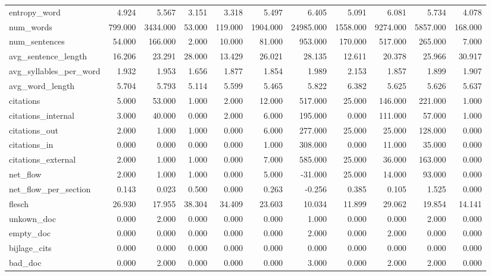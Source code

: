 \begin{tabular}{lrrrrrrrrrr}
\cline{1-11}
entropy\_word & 4.924 & 5.567 & 3.151 & 3.318 & 5.497 & 6.405 & 5.091 & 6.081 & 5.734 & 4.078 \\
\cline{1-11}
num\_words & 799.000 & 3434.000 & 53.000 & 119.000 & 1904.000 & 24985.000 & 1558.000 & 9274.000 & 5857.000 & 168.000 \\
\cline{1-11}
num\_sentences & 54.000 & 166.000 & 2.000 & 10.000 & 81.000 & 953.000 & 170.000 & 517.000 & 265.000 & 7.000 \\
\cline{1-11}
avg\_sentence\_length & 16.206 & 23.291 & 28.000 & 13.429 & 26.021 & 28.135 & 12.611 & 20.378 & 25.966 & 30.917 \\
\cline{1-11}
avg\_syllables\_per\_word & 1.932 & 1.953 & 1.656 & 1.877 & 1.854 & 1.989 & 2.153 & 1.857 & 1.899 & 1.907 \\
\cline{1-11}
avg\_word\_length & 5.704 & 5.793 & 5.114 & 5.599 & 5.465 & 5.822 & 6.382 & 5.625 & 5.626 & 5.637 \\
\cline{1-11}
citations & 5.000 & 53.000 & 1.000 & 2.000 & 12.000 & 517.000 & 25.000 & 146.000 & 221.000 & 1.000 \\
\cline{1-11}
citations\_internal & 3.000 & 40.000 & 0.000 & 2.000 & 6.000 & 195.000 & 0.000 & 111.000 & 57.000 & 1.000 \\
\cline{1-11}
citations\_out & 2.000 & 1.000 & 1.000 & 0.000 & 6.000 & 277.000 & 25.000 & 25.000 & 128.000 & 0.000 \\
\cline{1-11}
citations\_in & 0.000 & 0.000 & 0.000 & 0.000 & 1.000 & 308.000 & 0.000 & 11.000 & 35.000 & 0.000 \\
\cline{1-11}
citations\_external & 2.000 & 1.000 & 1.000 & 0.000 & 7.000 & 585.000 & 25.000 & 36.000 & 163.000 & 0.000 \\
\cline{1-11}
net\_flow & 2.000 & 1.000 & 1.000 & 0.000 & 5.000 & -31.000 & 25.000 & 14.000 & 93.000 & 0.000 \\
\cline{1-11}
net\_flow\_per\_section & 0.143 & 0.023 & 0.500 & 0.000 & 0.263 & -0.256 & 0.385 & 0.105 & 1.525 & 0.000 \\
\cline{1-11}
flesch & 26.930 & 17.955 & 38.304 & 34.409 & 23.603 & 10.034 & 11.899 & 29.062 & 19.854 & 14.141 \\
\cline{1-11}
unkown\_doc & 0.000 & 2.000 & 0.000 & 0.000 & 0.000 & 1.000 & 0.000 & 0.000 & 2.000 & 0.000 \\
\cline{1-11}
empty\_doc & 0.000 & 0.000 & 0.000 & 0.000 & 0.000 & 2.000 & 0.000 & 2.000 & 0.000 & 0.000 \\
\cline{1-11}
bijlage\_cits & 0.000 & 0.000 & 0.000 & 0.000 & 0.000 & 0.000 & 0.000 & 0.000 & 0.000 & 0.000 \\
\cline{1-11}
bad\_doc & 0.000 & 2.000 & 0.000 & 0.000 & 0.000 & 3.000 & 0.000 & 2.000 & 2.000 & 0.000 \\
\cline{1-11}
\bottomrule
\end{tabular}
